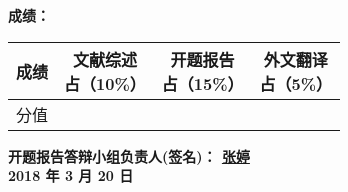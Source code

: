 {	{
		{\songti\sihao\bfseries
		成绩：}

		\vspace{2em}

		{
			\renewcommand{\baselinestretch}{1}
			\songti\sihao
			
\begin{flushleft}
	\begin{tabular}{|c|c|c|c|}
		\hline
		成绩 & \parbox[c]{4em}{\vspace{0.5em}\xiaosi 文献综述                              \\ 占（10\%） \vspace{0.5em}} & \parbox[c]{4em}{\vspace{0.5em}\xiaosi 开题报告 \\ 占（15\%） \vspace{0.5em}} & \parbox[c]{4em}{\vspace{0.5em}\xiaosi 外文翻译 \\ 占（5\%） \vspace{0.5em}} \\
		\hline
		分值 & {}                                    & {} & {} \\
		\hline
	\end{tabular}
\end{flushleft}

\vspace{7em}

\begin{flushright}

	{
		\songti\xiaosi\bfseries
		开题报告答辩小组负责人(签名)： \; \underline{\quad 张婷 \quad} \\
		2018 年 3 月 20 日 \par
	}
\end{flushright}
		}
	}









}
